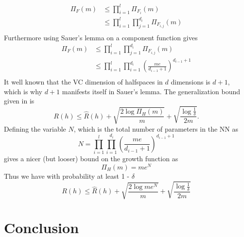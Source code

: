 \documentclass{article} %
\begin{document}
\begin{align*}
\Pi_F(m) &\leq \prod_{i=1}^l \Pi_{F_i}(m)\\
& \leq \prod_{i=1}^l\prod_{j=1}^{d_i} \Pi_{F_{i,j}}(m)\\
\end{align*}
Furthermore using Sauer's lemma on a component function gives
\begin{align*}
\Pi_F(m)& \leq \prod_{i=1}^l\prod_{j=1}^{d_i} \Pi_{F_{i,j}}(m)\\
& \leq \prod_{i=1}^l\prod_{i=1}^{d_i}(\frac{me}{d_{i-1}+1})^{d_{i-1}+1}\\
\end{align*}
It well known that the VC dimension of halfspaces in $d$ dimensions is $d +1$, which is why $d+1$ manifests itself in Sauer's lemma.
The generalization bound given in \cite{mohri} is 
$$
R(h) \leq \widehat{R}(h) + \sqrt{\frac{2\log{\Pi_H{(m)}}}{m}} + \sqrt{\frac{\log{\frac{1}{\delta}}}{2m}}.
$$
Defining the variable $N$, which is the total number of parameters in the NN as 
$$
N = \prod_{i=1}^l\prod_{i=1}^{d_i}(\frac{me}{d_{i-1}+1})^{d_{i-1}+1}
$$ 
gives a nicer (but looser) bound on the growth function as
$$
\Pi_H{(m)} = me^N
$$
Thus we have with probability at least 1 - $\delta$
$$
R(h) \leq \widehat{R}(h) + \sqrt{\frac{2\log{me^N}}{m}} + \sqrt{\frac{\log{\frac{1}{\delta}}}{2m}}
$$

\section{Conclusion}



\nocite{yang_multiagent_2004}
\nocite{kim_autonomous_2003}
\nocite{mohri_foundations_2012}

\newpage
{}





\end{document}
